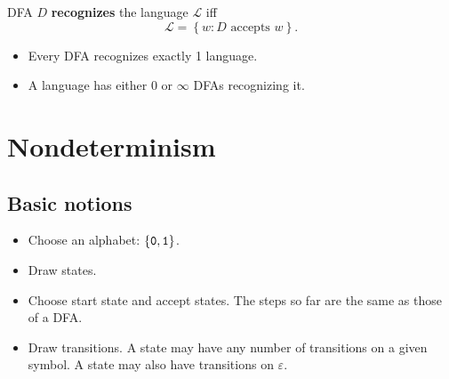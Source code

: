\documentclass{notes}
\begin{document}
\begin{defn}
  DFA $D$ {\boldmath \bfseries recognizes} the language $\mathcal L$ iff 
  \[
    \mathcal L = \left \{ w : \text{$D$ accepts $w$} \right \}.
  \]
\end{defn}

\begin{note}
  \vspace{-1em}
  \begin{itemize}
    \item Every DFA recognizes exactly 1 language.

    \item A language has either 0 or $\infty$ DFAs recognizing it.
  \end{itemize}
\end{note}

\section{Nondeterminism}

\subsection{Basic notions}

\begin{eg}
  \begin{center}
  \end{center}

  \begin{itemize}
    \item Choose an alphabet: $\left \{ \verb~0~, \verb~1~ \right \}$.

    \item Draw states.
      
    \item Choose start state and accept states.
    The steps so far are the same as those of a DFA.
      
    \item Draw transitions.
    A state may have any number of transitions on a given symbol.
    A state may also have transitions on $\varepsilon$.
  \end{itemize}
\end{eg}
\end{document}
